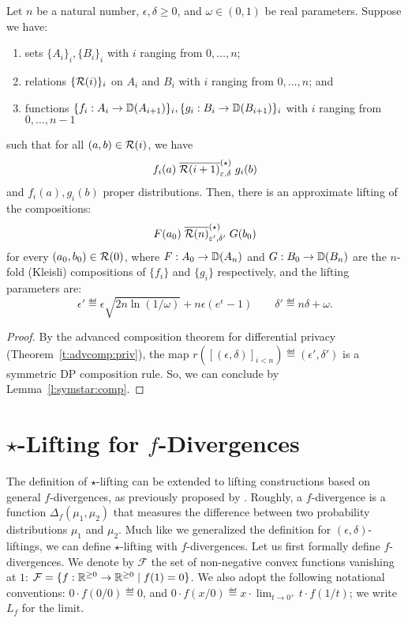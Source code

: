 \documentclass{lmcs}
\begin{document}
\begin{cor} \label{c:advcomp:star}
  Let $n$ be a natural number, $\epsilon, \delta \geq 0$, and $\omega \in (0,
  1)$ be real parameters. Suppose we have:
  \begin{enumerate}
    \item sets $\{ A_i \}_i, \{ B_i \}_i$ with $i$ ranging from $0, \dots, n$;
    \item relations $\{ \mathcal{R}(i) \}_i$ on $A_i$ and $B_i$ with $i$ ranging
      from $0, \dots, n$; and
    \item functions $\{ f_i : A_i \to {\mathbb{D}}(A_{i + 1}) \}_i, \{ g_i : B_i \to
      {\mathbb{D}}(B_{i + 1}) \}_i$ with $i$ ranging from $0, \dots, n - 1$
  \end{enumerate}
  such that for all $(a, b) \in \mathcal{R}(i)$, we have
  \[
    f_i(a) \mathrel{\mathrel{\overline{\mathcal{R}(i + 1)}^{(\star)}_{\varepsilon, \delta}}} g_i(b) 
  \]
  and $f_i(a), g_i(b)$ proper distributions. Then, there is an approximate
  lifting of the compositions:
  \[
    F(a_0)
    \mathrel{\mathrel{\overline{\mathcal{R}(n)}^{(\star)}_{\varepsilon', \delta'}}}
    G(b_0) 
  \]
  for every $(a_0, b_0) \in \mathcal{R}(0)$, where $F : A_0 \to {\mathbb{D}}(A_n)$ and $G : B_0
  \to {\mathbb{D}}(B_n)$ are the $n$-fold (Kleisli) compositions of $\{ f_i \}$ and $\{
  g_i \}$ respectively, and the lifting parameters are:
  \[
    \epsilon' \eqdef \epsilon \sqrt{2 n \ln(1/\omega)} + n \epsilon (e^\epsilon - 1)
    \quad\quad
    \delta' \eqdef n \delta + \omega .
  \]
\end{cor}
\begin{proof}
  By the advanced composition theorem for differential privacy
  (Theorem~\ref{t:advcomp:priv}), the map $r([(\epsilon, \delta)]_{i < n})
  \eqdef (\epsilon', \delta')$ is a symmetric DP composition rule. So, we can
  conclude by Lemma~\ref{l:symstar:comp}.
\end{proof}


\section{%
  \texorpdfstring
  {$\star$-Lifting for $f$-Divergences}
{*-Lifting for f-Divergences}} \label{s:fdiv}

The definition of $\star$-lifting can be extended to lifting
constructions based on general $f$-divergences, as previously proposed
by \citet{BartheO13,OlmedoThesis}. Roughly, a $f$-divergence is a function $\Delta_f
(\mu_1,\mu_2)$ that measures the difference between two probability
distributions $\mu_1$ and $\mu_2$.  Much like we generalized the
definition for $(\epsilon, \delta)$-liftings, we can define
$\star$-lifting with $f$-divergences. Let us first
formally define $f$-divergences.
We denote by $\mathcal{F}$ the set of non-negative convex
functions vanishing at $1$: $\mathcal{F} = \{ f:\mathbb{R}^{\geq 0} \rightarrow
\mathbb{R}^{\geq 0} \mid f(1)=0\}$.  We also adopt the following notational
conventions: $0 \cdot f(0/0) \eqdef 0$, and $0 \cdot f(x/0)
\eqdef x \cdot \lim_{t \to 0^+} t \cdot f(1/t)$; we write $L_f$ for the limit.
\end{document}
